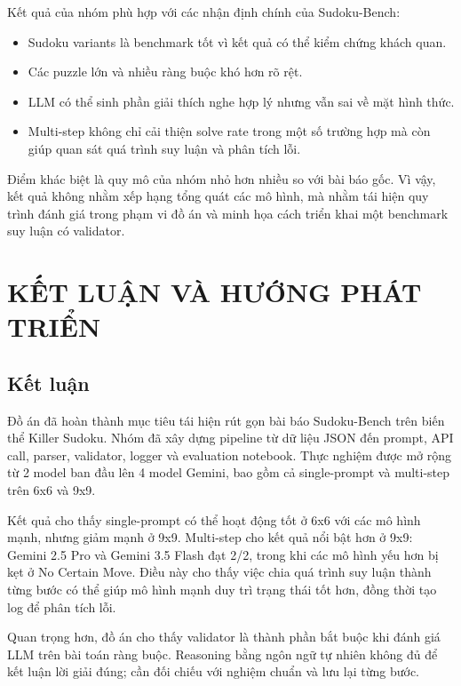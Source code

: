 \documentclass[12pt,a4paper,oneside]{report}
\newlength{\manualparindent}
\newcommand{\manualindent}{\hspace*{\manualparindent}}
\begin{document}
Kết quả của nhóm phù hợp với các nhận định chính của Sudoku-Bench:

\begin{itemize}
  \item Sudoku variants là benchmark tốt vì kết quả có thể kiểm chứng khách quan.
  \item Các puzzle lớn và nhiều ràng buộc khó hơn rõ rệt.
  \item LLM có thể sinh phần giải thích nghe hợp lý nhưng vẫn sai về mặt hình thức.
  \item Multi-step không chỉ cải thiện solve rate trong một số trường hợp mà còn giúp quan sát quá trình suy luận và phân tích lỗi.
\end{itemize}

Điểm khác biệt là quy mô của nhóm nhỏ hơn nhiều so với bài báo gốc. Vì vậy, kết quả không nhằm xếp hạng tổng quát các mô hình, mà nhằm tái hiện quy trình đánh giá trong phạm vi đồ án và minh họa cách triển khai một benchmark suy luận có validator.

\chapter{KẾT LUẬN VÀ HƯỚNG PHÁT TRIỂN}

\section{Kết luận}

\manualindent%
Đồ án đã hoàn thành mục tiêu tái hiện rút gọn bài báo Sudoku-Bench trên biến thể Killer Sudoku. Nhóm đã xây dựng pipeline từ dữ liệu JSON đến prompt, API call, parser, validator, logger và evaluation notebook. Thực nghiệm được mở rộng từ 2 model ban đầu lên 4 model Gemini, bao gồm cả single-prompt và multi-step trên 6x6 và 9x9.

\manualindent%
Kết quả cho thấy single-prompt có thể hoạt động tốt ở 6x6 với các mô hình mạnh, nhưng giảm mạnh ở 9x9. Multi-step cho kết quả nổi bật hơn ở 9x9: Gemini 2.5 Pro và Gemini 3.5 Flash đạt 2/2, trong khi các mô hình yếu hơn bị kẹt ở No Certain Move. Điều này cho thấy việc chia quá trình suy luận thành từng bước có thể giúp mô hình mạnh duy trì trạng thái tốt hơn, đồng thời tạo log để phân tích lỗi.

\manualindent%
Quan trọng hơn, đồ án cho thấy validator là thành phần bắt buộc khi đánh giá LLM trên bài toán ràng buộc. Reasoning bằng ngôn ngữ tự nhiên không đủ để kết luận lời giải đúng; cần đối chiếu với nghiệm chuẩn và lưu lại từng bước.
\end{document}
